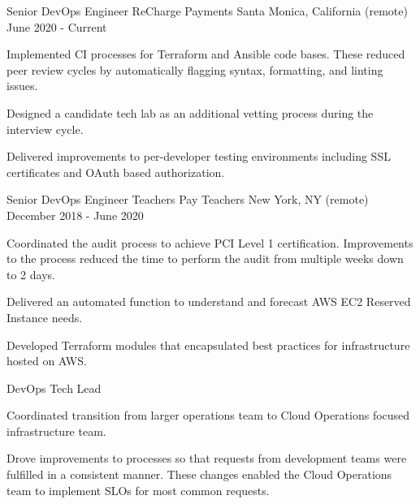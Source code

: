 

\begin{cventries}

  \cventry
  {Senior DevOps Engineer} %
  {ReCharge Payments} %
  {Santa Monica, California (remote)} %
  {June 2020 - Current} %
  { 
    \begin{cvitems} %
      \item {Implemented CI processes for Terraform and Ansible code bases. These reduced peer review cycles by automatically flagging syntax, formatting, and linting issues.}
      \item {Designed a candidate tech lab as an additional vetting process during the interview cycle.}
      \item {Delivered improvements to per-developer testing environments including SSL certificates and OAuth based authorization.}
    \end{cvitems}
  }

  \cventry
    {Senior DevOps Engineer} %
    {Teachers Pay Teachers} %
    {New York, NY (remote)} %
    {December 2018 - June 2020} %
    { 
      \begin{cvitems} %
        \item {Coordinated the audit process to achieve PCI Level 1 certification. Improvements to the process reduced the time to perform the audit from multiple weeks down to 2 days.}
        \item {Delivered an automated function to understand and forecast AWS EC2 Reserved Instance needs.}
        \item {Developed Terraform modules that encapsulated best practices for infrastructure hosted on AWS.}
      \end{cvitems}
    }

  \cventry
    {DevOps Tech Lead} %
    {} %
    {} %
    {}
    {
      \begin{cvitems} %
        \item {Coordinated transition from larger operations team to Cloud Operations focused infrastructure team.}
        \item {Drove improvements to processes so that requests from development teams were fulfilled in a consistent manner. These changes enabled the Cloud Operations team to implement SLOs for most common requests.}
      \end{cvitems}
    }


\end{cventries}
